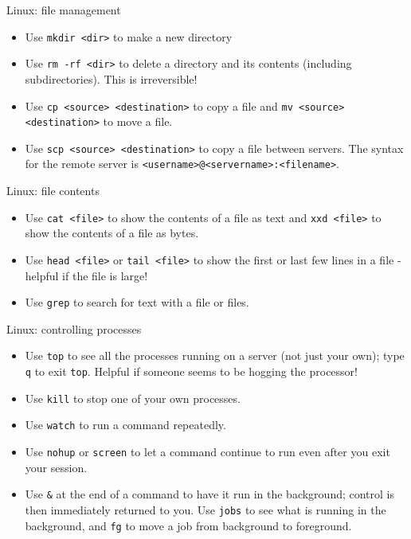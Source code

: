 \documentclass{beamer}
\newcommand{\command}[1]{\colorbox{light-gray}{\texttt{#1}}}
\newcommand{\filename}[1]{\colorbox{light-green}{\texttt{#1}}}
\begin{document}
\begin{frame}{Linux: file management}
  \begin{itemize}
  \item Use \command{mkdir <dir>} to make a new directory
  \item Use \command{rm -rf <dir>} to delete a directory and its contents (including subdirectories). This is irreversible!
  \item Use \command{cp <source> <destination>} to copy a file and \command{mv <source> <destination>} to move a file.
  \item Use \command{scp <source> <destination>} to copy a file between servers. The syntax for the remote server is \filename{<username>@<servername>:<filename>}.
  \end{itemize}
\end{frame}

\begin{frame}{Linux: file contents}
  \begin{itemize}
  \item Use \command{cat <file>} to show the contents of a file as text and \command{xxd <file>} to show the contents of a file as bytes.
  \item Use \command{head <file>} or \command{tail <file>} to show the first or last few lines in a file - helpful if the file is large!
  \item Use \command{grep} to search for text with a file or files.
  \end{itemize}
\end{frame}

\begin{frame}{Linux: controlling processes}
  \begin{itemize}
  \item Use \command{top} to see all the processes running on a server (not just your own); type \command{q} to exit \command{top}. Helpful if someone seems to be hogging the processor!
  \item Use \command{kill} to stop one of your own processes.
  \item Use \command{watch} to run a command repeatedly.
  \item Use \command{nohup} or \command{screen} to let a command continue to run even after you exit your session.
  \item Use \command{\&} at the end of a command to have it run in the background; control is then immediately returned to you. Use \command{jobs} to see what is running in the background, and \command{fg} to move a job from background to foreground.
  \end{itemize}
\end{frame}
\end{document}
